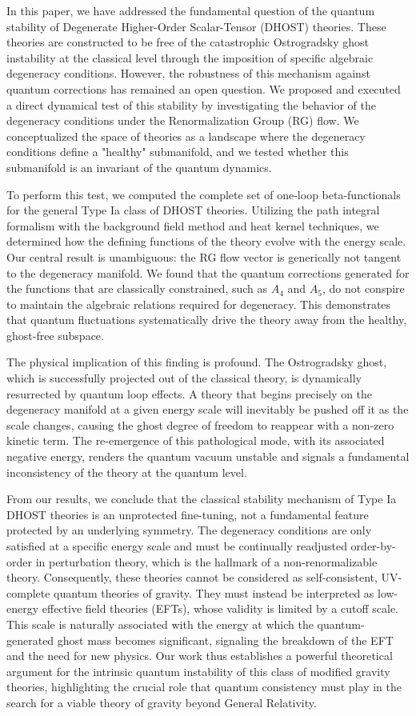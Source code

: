 \documentclass[twocolumn]{aastex631}
\begin{document}
In this paper, we have addressed the fundamental question of the quantum stability of Degenerate Higher-Order Scalar-Tensor (DHOST) theories. These theories are constructed to be free of the catastrophic Ostrogradsky ghost instability at the classical level through the imposition of specific algebraic degeneracy conditions. However, the robustness of this mechanism against quantum corrections has remained an open question. We proposed and executed a direct dynamical test of this stability by investigating the behavior of the degeneracy conditions under the Renormalization Group (RG) flow. We conceptualized the space of theories as a landscape where the degeneracy conditions define a "healthy" submanifold, and we tested whether this submanifold is an invariant of the quantum dynamics.

To perform this test, we computed the complete set of one-loop beta-functionals for the general Type Ia class of DHOST theories. Utilizing the path integral formalism with the background field method and heat kernel techniques, we determined how the defining functions of the theory evolve with the energy scale. Our central result is unambiguous: the RG flow vector is generically not tangent to the degeneracy manifold. We found that the quantum corrections generated for the functions that are classically constrained, such as $A_4$ and $A_5$, do not conspire to maintain the algebraic relations required for degeneracy. This demonstrates that quantum fluctuations systematically drive the theory away from the healthy, ghost-free subspace.

The physical implication of this finding is profound. The Ostrogradsky ghost, which is successfully projected out of the classical theory, is dynamically resurrected by quantum loop effects. A theory that begins precisely on the degeneracy manifold at a given energy scale will inevitably be pushed off it as the scale changes, causing the ghost degree of freedom to reappear with a non-zero kinetic term. The re-emergence of this pathological mode, with its associated negative energy, renders the quantum vacuum unstable and signals a fundamental inconsistency of the theory at the quantum level.

From our results, we conclude that the classical stability mechanism of Type Ia DHOST theories is an unprotected fine-tuning, not a fundamental feature protected by an underlying symmetry. The degeneracy conditions are only satisfied at a specific energy scale and must be continually readjusted order-by-order in perturbation theory, which is the hallmark of a non-renormalizable theory. Consequently, these theories cannot be considered as self-consistent, UV-complete quantum theories of gravity. They must instead be interpreted as low-energy effective field theories (EFTs), whose validity is limited by a cutoff scale. This scale is naturally associated with the energy at which the quantum-generated ghost mass becomes significant, signaling the breakdown of the EFT and the need for new physics. Our work thus establishes a powerful theoretical argument for the intrinsic quantum instability of this class of modified gravity theories, highlighting the crucial role that quantum consistency must play in the search for a viable theory of gravity beyond General Relativity.
\end{document}
